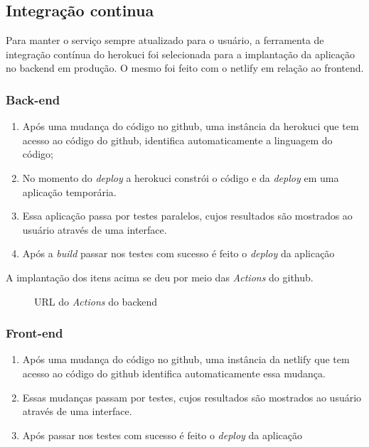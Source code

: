 \subsection{Integração continua}
Para manter o serviço sempre atualizado para o usuário, a ferramenta de integração contínua do \gls{herokuci} foi selecionada para a implantação da aplicação no \gls{backend} em produção. O mesmo foi feito com o \gls{netlify} em relação ao \gls{frontend}.
\subsubsection{Back-end}
\begin{enumerate}
    \item Após uma mudança do código no \gls{github}, uma instância da \gls{herokuci} que tem acesso ao código do \gls{github}, identifica automaticamente
    a linguagem do código; 
    \item No momento do \emph{\gls{deploy}} a \gls{herokuci} constrói o código e da \emph{\gls{deploy}} em uma aplicação temporária.
    \item Essa aplicação passa por testes paralelos, cujos resultados são mostrados ao usuário através de uma interface.
    \item Após a \emph{build} passar nos testes com sucesso é feito o \emph{\gls{deploy}} da aplicação 
\end{enumerate} 

A implantação dos itens acima se deu por meio das \emph{Actions} do \gls{github}.

\begin{figure}[htb]
	\caption{\label{qr-url-back}URL do \emph{Actions} do \gls{backend}}
	\begin{center}
	\end{center}
\end{figure}

\subsubsection{Front-end}
\begin{enumerate}
    \item Após uma mudança do código no \gls{github}, uma instância da \gls{netlify} que tem acesso ao código do \gls{github} identifica automaticamente essa mudança.
    \item Essas mudanças passam por testes, cujos resultados são mostrados ao usuário através de uma interface.
    \item Após passar nos testes com sucesso é feito o \emph{\gls{deploy}} da aplicação 
\end{enumerate} 

